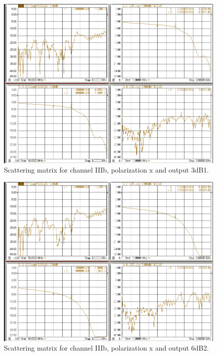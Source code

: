 \documentclass[12pt,a4paper,oneside]{article}
\begin{document}
\begin{figure}[H]
\centering
\includegraphics[width=0.9\linewidth]{VNA_results/IIIbx_3dB1.png}
\caption{Scattering matrix for channel IIIb, polarization x and output 3dB1.}
\label{fig:IIIbx_3dB1}
\end{figure}


\begin{figure}[H]
\centering
\includegraphics[width=0.9\linewidth]{VNA_results/IIIbx_6dB2.png}
\caption{Scattering matrix for channel IIIb, polarization x and output 6dB2.}
\label{fig:IIIbx_6dB2}
\end{figure}
\end{document}
